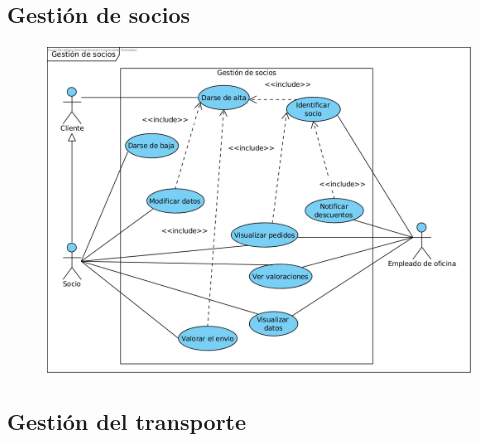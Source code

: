 \subsection{Gestión de socios}
\begin{figure}[h]
	\centering
	\includegraphics[width=15cm]{Gestion_socios.png}
\end{figure}

\newpage

\subsection{Gestión del transporte}


\newpage


